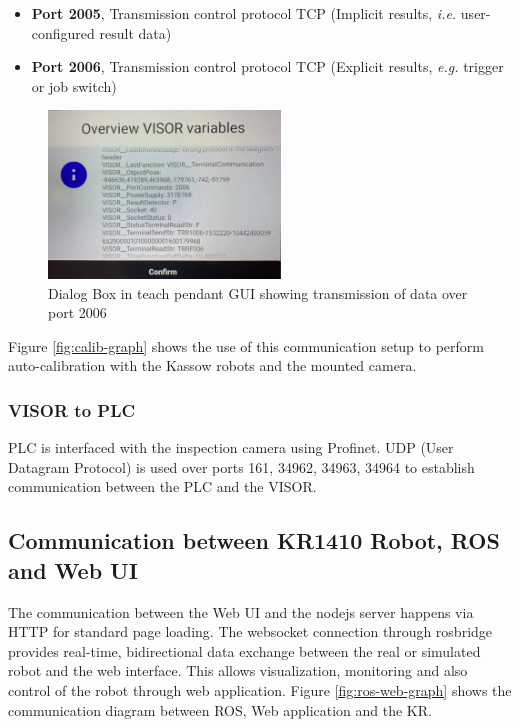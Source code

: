 \begin{itemize}
  \item \textbf{Port 2005}, Transmission control protocol TCP (Implicit results, \textit{i.e.} user-configured result data)
  \item \textbf{Port 2006}, Transmission control protocol TCP (Explicit results, \textit{e.g.} trigger or job switch)
\end{itemize}


\begin{figure}[h]
  \centering
  \includegraphics[width=0.55\textwidth]{figures/visor-cbun-connection.png}
  \caption{Dialog Box in teach pendant GUI showing transmission of data over port 2006}
  \label{fig:cbun-variables}
\end{figure}

Figure \ref{fig:calib-graph} shows the use of this communication setup to perform auto-calibration with the Kassow robots and the mounted camera.

\subsubsection{VISOR to PLC}
PLC is interfaced with the inspection camera using Profinet.
UDP (User Datagram Protocol) is used over ports 161, 34962, 34963, 34964 to establish communication between the PLC and the VISOR. \cite{visor_communication_manual}


\subsection{Communication between KR1410 Robot, ROS and Web UI}
\label{subsec:KR1410ROS}

The communication between the Web UI and the nodejs server happens via HTTP for standard page loading. The websocket connection through rosbridge provides real-time, bidirectional data exchange between the real or simulated robot and the web interface. This allows visualization, monitoring
and also control of the robot through web application. Figure \ref{fig:ros-web-graph} shows the communication diagram between ROS, Web application and the KR.

